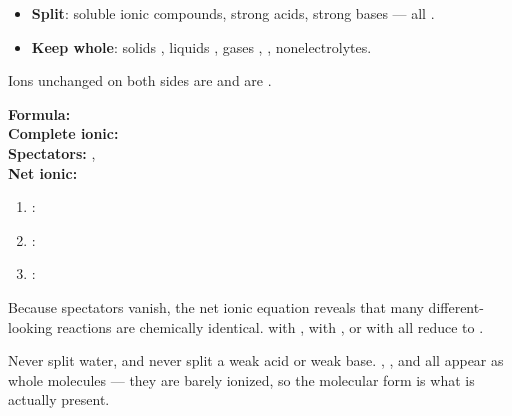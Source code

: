 \documentclass{apchem-notes}
\begin{document}

\begin{itemize}[leftmargin=*,itemsep=0.25em]
  \item \textbf{Split}: soluble ionic compounds, strong acids, strong bases
        --- all .
  \item \textbf{Keep whole}: solids , liquids , gases
        , ,
        nonelectrolytes.
\end{itemize}

Ions unchanged on both sides are  and are
.

\begin{workedexample}
\textbf{Formula:} \\
\textbf{Complete ionic:}
\\
\textbf{Spectators:} , \\
\textbf{Net ionic:} 
\end{workedexample}


\begin{enumerate}[leftmargin=*,itemsep=0.35em]
  \item {}:
  \item {}:
  \item {}:
\end{enumerate}



Because spectators vanish, the net ionic equation reveals that many
different-looking reactions are chemically identical.  with
, with , or with  all reduce to
.

\begin{apctrap}
Never split water, and never split a weak acid or weak base. ,
, and  all appear as whole molecules --- they are barely
ionized, so the molecular form is what is actually present.
\end{apctrap}
\end{document}
